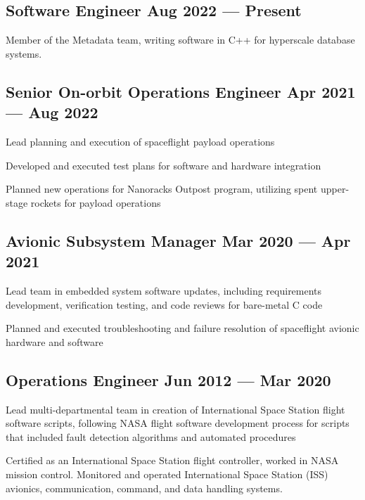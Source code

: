 \documentclass[letter,10pt]{article}
\begin{document}
\subsection{{Software Engineer \hfill Aug 2022 --- Present}}
\begin{zitemize}
\item Member of the Metadata team, writing software in C++ for hyperscale database systems.
\end{zitemize}

\subsection{{Senior On-orbit Operations Engineer \hfill Apr 2021 --- Aug 2022}}
\begin{zitemize}
\item Lead planning and execution of spaceflight payload operations
\item Developed and executed test plans for software and hardware integration
\item Planned new operations for Nanoracks Outpost program, utilizing spent upper-stage rockets for payload operations
\end{zitemize}

\subsection{{Avionic Subsystem Manager \hfill Mar 2020 --- Apr 2021}}
\begin{zitemize}
\item Lead team in embedded system software updates, including requirements development, verification testing, and code reviews for bare-metal C code
\item Planned and executed troubleshooting and failure resolution of spaceflight avionic hardware and software
\end{zitemize}

\subsection{{Operations Engineer \hfill Jun 2012 --- Mar 2020}}
\begin{zitemize}
\item Lead multi-departmental team in creation of International Space Station flight software scripts, following NASA flight software development process for scripts that included fault detection algorithms and automated procedures
\item Certified as an International Space Station flight controller, worked in NASA mission control.
Monitored and operated International Space Station (ISS) avionics, communication, command, and
data handling systems.
\end{zitemize}
\end{document}
